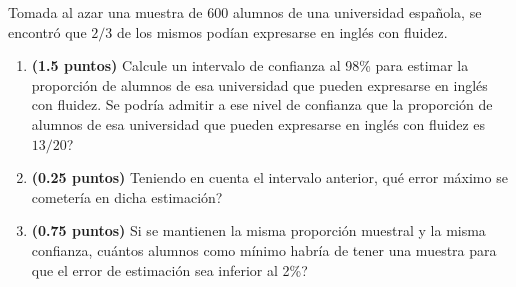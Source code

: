 
Tomada al azar una muestra de 600 alumnos de una universidad española, se encontró que $2/3$ de los mismos podían expresarse en inglés con fluidez.
\begin{enumerate}[label=\alph*)]
\item \textbf{(1.5 puntos)} Calcule un intervalo de confianza al 98\% para estimar la proporción de alumnos de esa universidad que pueden expresarse en inglés con fluidez. \textquestiondown{}Se podría admitir a ese nivel de confianza que la proporción de alumnos de esa universidad que pueden expresarse en inglés con fluidez es $13/20$?
\item \textbf{(0.25 puntos)} Teniendo en cuenta el intervalo anterior, \textquestiondown{}qué error máximo se cometería en dicha estimación?
\item \textbf{(0.75 puntos)} Si se mantienen la misma proporción muestral y la misma confianza, \textquestiondown{}cuántos alumnos como mínimo habría de tener una muestra para que el error de estimación sea inferior al 2\%?
\end{enumerate}
